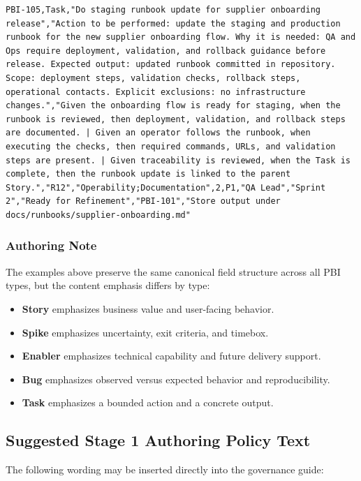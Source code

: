 \documentclass[11pt,a4paper]{article}
\begin{document}
\begin{tcolorbox}[title=Example Canonical Backlog CSV,colback=white,colframe=black]
\begin{lstlisting}[style=csvstyle]
PBI-105,Task,"Do staging runbook update for supplier onboarding release","Action to be performed: update the staging and production runbook for the new supplier onboarding flow. Why it is needed: QA and Ops require deployment, validation, and rollback guidance before release. Expected output: updated runbook committed in repository. Scope: deployment steps, validation checks, rollback steps, operational contacts. Explicit exclusions: no infrastructure changes.","Given the onboarding flow is ready for staging, when the runbook is reviewed, then deployment, validation, and rollback steps are documented. | Given an operator follows the runbook, when executing the checks, then required commands, URLs, and validation steps are present. | Given traceability is reviewed, when the Task is complete, then the runbook update is linked to the parent Story.","R12","Operability;Documentation",2,P1,"QA Lead","Sprint 2","Ready for Refinement","PBI-101","Store output under docs/runbooks/supplier-onboarding.md"
\end{lstlisting}
\end{tcolorbox}

\subsubsection*{Authoring Note}

The examples above preserve the same canonical field structure across all PBI types, but the content emphasis differs by type:

\begin{itemize}[leftmargin=1.5em]
    \item \textbf{Story} emphasizes business value and user-facing behavior.
    \item \textbf{Spike} emphasizes uncertainty, exit criteria, and timebox.
    \item \textbf{Enabler} emphasizes technical capability and future delivery support.
    \item \textbf{Bug} emphasizes observed versus expected behavior and reproducibility.
    \item \textbf{Task} emphasizes a bounded action and a concrete output.
\end{itemize}


\subsection{Suggested Stage 1 Authoring Policy Text}

The following wording may be inserted directly into the governance guide:
\end{document}
